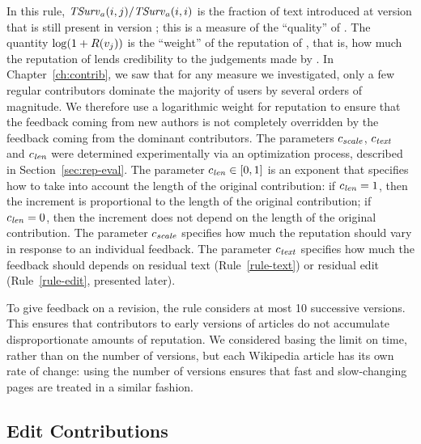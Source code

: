 \noindent
In this rule, $\mathit{TSurv}_{a}(i,j) / \mathit{TSurv}_{a}(i,i)$ is the fraction of text
introduced at version  that is still present in version ;
this is a measure of the ``quality'' of .
The quantity $\log(1 + R(v_{j}))$ is the ``weight'' of the
reputation of ,
that is, how much the reputation of  lends
credibility to the judgements made by .
In Chapter~\ref{ch:contrib}, we saw that for any measure we investigated,
only a few regular contributors dominate the majority of users by
several orders of magnitude.
We therefore use a logarithmic weight for reputation
to ensure that the feedback coming from new authors is not completely
overridden by the feedback coming from the dominant contributors.
The parameters ${c_{{\text{\textit{scale}}}}}$, ${c_{{\text{\textit{text}}}}}$ and ${c_{{\text{\textit{len}}}}}$ were
determined experimentally via an optimization process, described
in Section~\ref{sec:rep-eval}.
The parameter ${c_{{\text{\textit{len}}}}} \in [0,1]$ is an exponent that specifies how
to take into account the length of the original contribution: if
${c_{{\text{\textit{len}}}}} = 1$, then the increment is proportional to the length of
the original contribution; if ${c_{{\text{\textit{len}}}}} = 0$, then the increment
does not depend on the length of the original contribution.
The parameter ${c_{{\text{\textit{scale}}}}}$ specifies how much the reputation should
vary in response to an individual feedback.
The parameter ${c_{{\text{\textit{text}}}}}$ specifies how much the feedback should
depends on residual text (Rule~\ref{rule-text}) or residual edit
(Rule~\ref{rule-edit}, presented later).

To give feedback on a revision, the rule considers at most 10
successive versions.
This ensures that contributors to early versions of articles do not
accumulate disproportionate amounts of reputation.
We considered basing the limit on time, rather than on the number of
versions, but each Wikipedia article has its own rate of change:
using the number of versions ensures that fast and
slow-changing pages are treated in a similar fashion.

\subsection{Edit Contributions}

